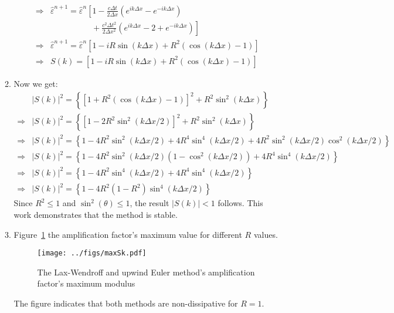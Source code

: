 \documentclass[12pt,a4]{article}
\begin{document}
\begin{enumerate}
\begin{enumerate}
\begin{align*}
          \Rightarrow & \hat \varepsilon^{n + 1} = \hat \varepsilon^n\left[1  - \frac{c \Delta t}{2 \Delta x } (e^{ik\Delta x} - e^{-ik\Delta x})\right. \\
                      & \qquad \qquad \quad + \left.\frac{c^2 \Delta t^2}{2 \Delta x^2}(e^{ik\Delta x} - 2  + e^{-ik\Delta x}) \right]\\
          \Rightarrow & \hat \varepsilon^{n + 1} = \hat \varepsilon^n\left[1  - i R \sin (k \Delta x) + R^2 (\cos (k\Delta x) - 1 ) \right]\\
          \Rightarrow & S(k) = \left[1  - iR \sin (k \Delta x) + R^2 (\cos (k\Delta x) - 1 ) \right]
        \end{align*}
      \item
        Now we get:
        \begin{align*}
                      & |S(k)|^2 = \left\{\left[1 + R^2 (\cos (k\Delta x) - 1 )\right]^2 + R^2 \sin^2 (k \Delta x)  \right\}\\
          \Rightarrow & |S(k)|^2 = \left\{\left[1 - 2 R^2 \sin^2(k \Delta x / 2)\right]^2 + R^2 \sin^2 (k \Delta x)  \right\}\\
          \Rightarrow & |S(k)|^2 = \left\{1  - 4 R^2 \sin^2 (k \Delta x / 2) + 4 R^4 \sin^4 (k \Delta x / 2)+ 4R^2 \sin^2(k \Delta x / 2)\cos^2(k \Delta x / 2) \right\} \\
          \Rightarrow & |S(k)|^2 = \left\{1  - 4 R^2 \sin^2 (k \Delta x / 2)(1 - \cos^2(k \Delta x / 2)) + 4 R^4 \sin^4 (k \Delta x / 2) \right\} \\
          \Rightarrow & |S(k)|^2 = \left\{1  - 4 R^2 \sin^4 (k \Delta x / 2) + 4 R^4 \sin^4 (k \Delta x / 2) \right\} \\
          \Rightarrow & |S(k)|^2 = \left\{1  - 4 R^2 (1 - R^2) \sin^4 (k \Delta x / 2) \right\} 
        \end{align*}
        Since $R^2 \leq 1$  and $\sin^2(\theta) \leq 1$, the result $|S(k)| < 1$ follows. 
        This work demonstrates that the method is stable.
      \item
        Figure~\ref{fig:maxSk} the amplification factor's maximum value for different $R$ values.
        \begin{figure}[H]
          \centering
          \texttt{[image: ../figs/maxSk.pdf]}
          \caption{The Lax-Wendroff and upwind Euler method's amplification factor's maximum modulus}
          \label{fig:maxSk}
        \end{figure}
        The figure indicates that both methods are non-dissipative for $R = 1$.

\end{enumerate}
\end{enumerate}
\end{document}

